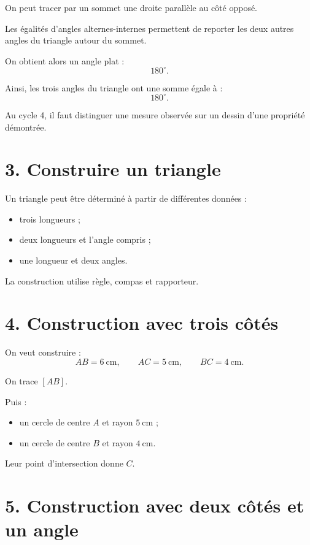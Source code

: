 On peut tracer par un sommet une droite parallèle au côté opposé.

Les égalités d'angles alternes-internes permettent de reporter les deux autres angles du triangle autour du sommet.

On obtient alors un angle plat :
\[
180^\circ.
\]

Ainsi, les trois angles du triangle ont une somme égale à :
\[
180^\circ.
\]

\begin{remarque}
Au cycle 4, il faut distinguer une mesure observée sur un dessin d'une propriété démontrée.
\end{remarque}

\section{3. Construire un triangle}

Un triangle peut être déterminé à partir de différentes données :
\begin{itemize}
\item trois longueurs ;
\item deux longueurs et l'angle compris ;
\item une longueur et deux angles.
\end{itemize}

La construction utilise règle, compas et rapporteur.

\section{4. Construction avec trois côtés}

On veut construire :
\[
AB=6\ \text{cm},\qquad
AC=5\ \text{cm},\qquad
BC=4\ \text{cm}.
\]

On trace $[AB]$.

Puis :
\begin{itemize}
\item un cercle de centre $A$ et rayon $5\ \text{cm}$ ;
\item un cercle de centre $B$ et rayon $4\ \text{cm}$.
\end{itemize}

Leur point d'intersection donne $C$.

\section{5. Construction avec deux côtés et un angle}

